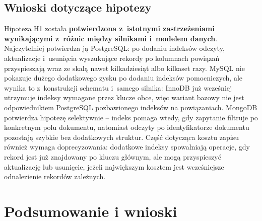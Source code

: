 \documentclass[12pt,a4paper]{article}
\begin{document}
\subsection{Wnioski dotyczące hipotezy}

Hipoteza H1 została \textbf{potwierdzona z~istotnymi zastrzeżeniami wynikającymi z~różnic między silnikami i~modelem danych}. Najczytelniej potwierdza ją PostgreSQL: po dodaniu indeksów odczyty, aktualizacje i~usunięcia wyszukujące rekordy po kolumnach powiązań przyspieszają wraz ze skalą nawet kilkadziesiąt albo kilkaset razy. MySQL nie pokazuje dużego dodatkowego zysku po dodaniu indeksów pomocniczych, ale wynika to z~konstrukcji schematu i~samego silnika: InnoDB już wcześniej utrzymuje indeksy wymagane przez klucze obce, więc wariant bazowy nie jest odpowiednikiem PostgreSQL pozbawionego indeksów na powiązaniach. MongoDB potwierdza hipotezę selektywnie -- indeks pomaga wtedy, gdy zapytanie filtruje po konkretnym polu dokumentu, natomiast odczyty po identyfikatorze dokumentu pozostają szybkie bez dodatkowych struktur. Część dotycząca kosztu zapisu również wymaga doprecyzowania: dodatkowe indeksy spowalniają operacje, gdy rekord jest już znajdowany po kluczu głównym, ale mogą przyspieszyć aktualizację lub usunięcie, jeżeli największym kosztem jest wcześniejsze odnalezienie rekordów zależnych.


\section{Podsumowanie i wnioski}
\end{document}
